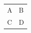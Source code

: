 \documentclass{article}
\begin{document}
\begin{longtable}{ll}A & B\\ C & D\end{longtable}
\end{document}
